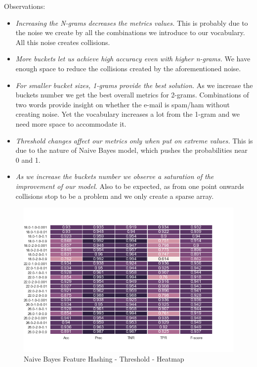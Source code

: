 \documentclass[12pt]{article}
\begin{document}
Observations:
    
\begin{itemize}
          
      \item \textit{Increasing the N-grams decreases the metrics values. }
          This is probably due to the noise we create by all the combinations we introduce to our vocabulary. All this noise creates collisions.

        \item \textit{More buckets let us achieve high accuracy even with higher n-grams.}
          We have enough space to reduce the collisions created by the aforementioned noise.

      \item \textit{For smaller bucket sizes, 1-grams provide the best solution.} As we increase the buckets number we get the best overall metrics for 2-grams.
          Combinations of two words provide insight on whether the e-mail is spam/ham without creating noise. Yet the vocabulary increases a lot from the 1-gram and we need more space to accommodate it.

        \item \textit{Threshold changes affect our metrics only when put on extreme values.}
          This is due to the nature of Naive Bayes model, which pushes the probabilities near 0 and 1.

        \item \textit{As we increase the buckets number we observe a saturation of the improvement of our model.}
          Also to be expected, as from one point onwards collisions stop to be a problem and we only create a sparse array.

     \end{itemize}

\begin{figure}[h]
    \centering
    \includegraphics[scale=0.8]{./SpamFilter/code/nbfhthres}
    \caption{Naive Bayes Feature Hashing - Threshold - Heatmap}
    \label{nbfht}
\end{figure}
\end{document}
